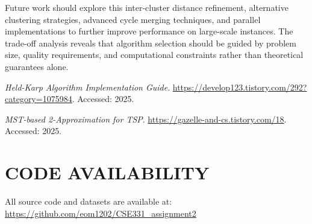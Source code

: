 \documentclass[sigconf]{acmart}
\begin{document}
Future work should explore this inter-cluster distance refinement, alternative clustering strategies, advanced cycle merging techniques, and parallel implementations to further improve performance on large-scale instances. The trade-off analysis reveals that algorithm selection should be guided by problem size, quality requirements, and computational constraints rather than theoretical guarantees alone.

\begin{thebibliography}{2}

\textit{Held-Karp Algorithm Implementation Guide}.
\url{https://develop123.tistory.com/292?category=1075984}.
Accessed: 2025.

\textit{MST-based 2-Approximation for TSP}.
\url{https://gazelle-and-cs.tistory.com/18}.
Accessed: 2025.

\end{thebibliography}

\section*{CODE AVAILABILITY}
All source code and datasets are available at: \url{https://github.com/eom1202/CSE331_assignment2}




\end{document}
